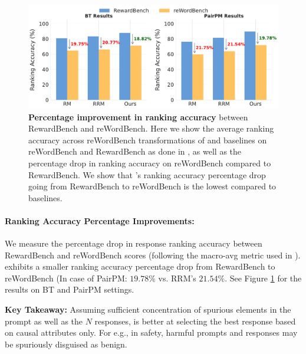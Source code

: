 \begin{figure}[ht]
    \centering
    \includegraphics[width=0.7\linewidth]{images/reword_ranking_acc_drop_gemma9b_bt_pairpm_blueyellow.pdf}
    \caption{\textbf{Percentage improvement in ranking accuracy} between RewardBench and reWordBench. Here we show the average ranking accuracy across reWordBench transformations of \carma{} and baselines on reWordBench and RewardBench as done in \citet{wu2025rewordbench}, as well as the percentage drop in ranking accuracy on reWordBench compared to RewardBench. We show that \carma{}'s ranking accuracy percentage drop going from RewardBench to reWordBench is the lowest compared to baselines.\vspace{-0.1in}}
    \label{fig:reword_ranking_acc_drop_gemma9b_bt_pairpm}
\end{figure}

\paragraph{Ranking Accuracy Percentage Improvements:}
We measure the percentage drop in response ranking accuracy between RewardBench and reWordBench scores (following the macro-avg metric used in \citet{wu2025rewordbench}). \carma{} exhibits a smaller ranking accuracy percentage drop from RewardBench to reWordBench (In case of PairPM: $19.78$\% vs. RRM's $21.54$\%. See  Figure \ref{fig:reword_ranking_acc_drop_gemma9b_bt_pairpm} for the results on BT and PairPM settings.

\vspace{0.02in}
\begin{takeawaybox}
\textbf{Key Takeaway:} Assuming sufficient concentration of spurious elements in the prompt as well as the $N$ responses, \carma{} is better at selecting the best response based on causal attributes only. For e.g., in safety, harmful prompts and responses may be spuriously disguised as benign. 
\end{takeawaybox}

\clearpage

